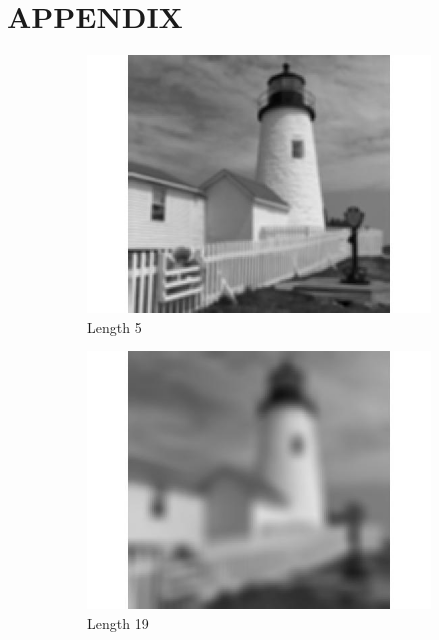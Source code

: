 \documentclass[a4paper, 11pt]{article}
\begin{document}
\section*{APPENDIX}
\begin{figure}[h]
\begin{center}
	\begin{subfigure}[b]{0.3\textwidth}
		\includegraphics[width=\textwidth]{h_5.jpg}
		\caption{Length 5}
	\end{subfigure}
	\begin{subfigure}[b]{0.3\textwidth}
		\includegraphics[width=\textwidth]{h_19.jpg}
		\caption{Length 19}
	\end{subfigure}
	\begin{subfigure}[b]{0.3\textwidth}

\end{subfigure}
\end{center}
\end{figure}
\end{document}
